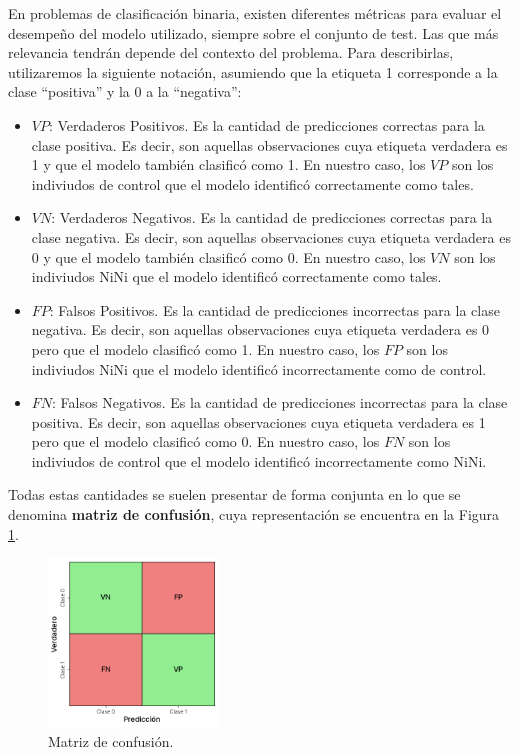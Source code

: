 \documentclass[../../main.tex]{subfiles}
\begin{document}
En problemas de clasificación binaria, existen diferentes métricas para evaluar el
desempeño del modelo utilizado, siempre sobre el conjunto de test. Las que más relevancia
tendrán depende del contexto del problema. Para describirlas, utilizaremos la siguiente
notación, asumiendo que la etiqueta 1 corresponde a la clase ``positiva'' y la 0 a la
``negativa'':
\begin{itemize}
    \item \(VP\): Verdaderos Positivos. Es la cantidad de predicciones correctas para la
    clase positiva. Es decir, son aquellas observaciones cuya etiqueta verdadera es 1 y
    que el modelo también clasificó como 1. En nuestro caso, los \(VP\) son los indiviudos
    de control que el modelo identificó correctamente como tales.
    \item \(VN\): Verdaderos Negativos. Es la cantidad de predicciones correctas para la
    clase negativa. Es decir, son aquellas observaciones cuya etiqueta verdadera es 0 y
    que el modelo también clasificó como 0. En nuestro caso, los \(VN\) son los indiviudos
    NiNi que el modelo identificó correctamente como tales.
    \item \(FP\): Falsos Positivos. Es la cantidad de predicciones incorrectas para la
    clase negativa. Es decir, son aquellas observaciones cuya etiqueta verdadera es 0 pero
    que el modelo clasificó como 1. En nuestro caso, los \(FP\) son los indiviudos NiNi
    que el modelo identificó incorrectamente como de control.
    \item \(FN\): Falsos Negativos. Es la cantidad de predicciones incorrectas para la
    clase positiva. Es decir, son aquellas observaciones cuya etiqueta verdadera es 1 pero
    que el modelo clasificó como 0. En nuestro caso, los \(FN\) son los indiviudos de
    control que el modelo identificó incorrectamente como NiNi.
\end{itemize}

Todas estas cantidades se suelen presentar de forma conjunta en lo que se denomina
\textbf{matriz de confusión}, cuya representación se encuentra en la Figura
\ref{fig:confusion-matrix}.

\begin{figure}[H]
    \centering
    \includegraphics[width=0.4\textwidth]{figs/matriz-confusion.png}
    \caption{Matriz de confusión.}
    \label{fig:confusion-matrix}
\end{figure}
\end{document}

